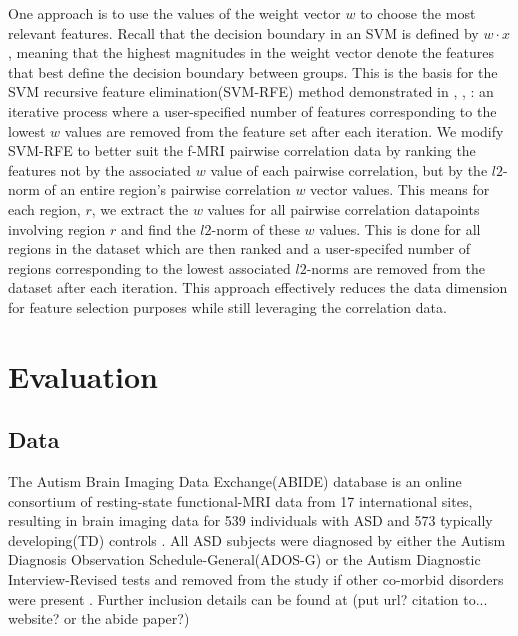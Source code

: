 \documentclass{llncs}
\begin{document}
One approach is to use the values of the weight vector $w$ to choose the most relevant features.  Recall that the decision boundary in an SVM is defined by $w \cdot x$, meaning that the highest magnitudes in the weight vector denote the features that best define the decision boundary between groups. This is the basis for the SVM recursive feature elimination(SVM-RFE) method demonstrated in \cite{guyon2002gene}, \cite{abide}, \cite{ecker2010}: an iterative process where a user-specified number of features corresponding to the lowest $w$ values are removed from the feature set after each iteration. We modify SVM-RFE to better suit the f-MRI pairwise correlation data by ranking the features not by the associated $w$ value of each pairwise correlation, but by the $l2$-norm of an entire region's pairwise correlation $w$ vector values. This means for each region, $r$, we extract the $w$ values for all pairwise correlation datapoints involving region $r$ and find the $l2$-norm of these $w$ values. This is done for all regions in the dataset which are then ranked and a user-specifed number of regions corresponding to the lowest associated $l2$-norms are removed from the dataset after each iteration.   This approach effectively reduces the data dimension for feature selection purposes while still leveraging the correlation data.  

\section{Evaluation}
\subsection{Data}
The Autism Brain Imaging Data Exchange(ABIDE) database is an online consortium of resting-state functional-MRI data from 17 international sites, resulting in brain imaging data for 539 individuals with ASD and 573 typically developing(TD)  controls \cite{abide}. All ASD subjects were diagnosed by either the Autism Diagnosis Observation Schedule-General(ADOS-G) or the Autism Diagnostic Interview-Revised tests and removed from the study if other co-morbid disorders were present \cite{lordADOS} \cite{lordADIR} \cite{abide}.  Further inclusion details can be found at (put url? citation to... website? or the abide paper?)
\end{document}
